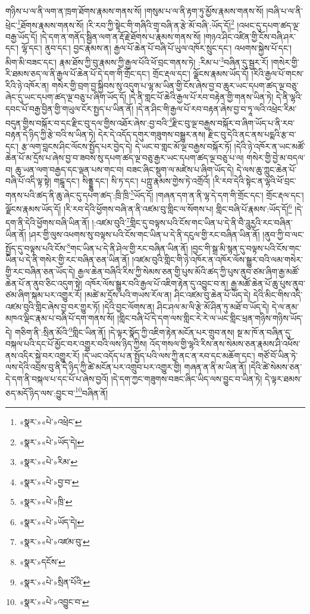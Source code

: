 གཉིས་པ་ལ་ནི་ལག་ན་ཁྲག་ཐོགས་རྣམས་གནས་སོ། །གསུམ་པ་ལ་ནི་རྟག་ཏུ་མྱོས་རྣམས་གནས་སོ། །བཞི་པ་ལ་ནི་ཕྲེང་\footnote{«སྣར་»«པེ་»འཕྲེང་}ཐོགས་རྣམས་གནས་སོ། །རི་རབ་ཀྱི་སྟེང་གི་གཞིའི་གྲྭ་བཞི་ན་རྩེ་མོ་བཞི་:ཡོད་དོ།\footnote{«སྣར་»«པེ་»ཡོད་དེ།} །འཕང་དུ་དཔག་ཚད་ལྔ་བརྒྱ་ཡོད་དོ། །དེ་དག་ན་གནོད་སྦྱིན་ལག་ན་རྡོ་རྗེ་ཐོགས་པ་རྣམས་གནས་སོ། །གཉའ་ཤིང་འཛིན་གྱི་ངོས་བཞི་ཤར་དང་། ལྷོ་དང་། ནུབ་དང་། བྱང་རྣམས་ན། རྒྱལ་པོ་ཆེན་པོ་བཞི་པོ་ཡུལ་འཁོར་སྲུང་དང་། འཕགས་སྐྱེས་པོ་དང་། མིག་མི་བཟང་དང་། རྣམ་ཐོས་ཀྱི་བུ་རྣམས་ཀྱི་རྒྱལ་པོའི་ཕོ་བྲང་གནས་ཏེ། :རིམ་པ་\footnote{«སྣར་»«པེ་»རིམ་}བཞིན་དུ་སྦྱར་རོ། །གསེར་གྱི་རི་ཐམས་ཅད་ལ་ནི་རྒྱལ་པོ་ཆེན་པོ་དེ་དག་གི་གྲོང་དང་། གྲོང་རྡལ་དང་། ལྗོངས་རྣམས་ཡོད་དོ། །རིའི་རྒྱལ་པོ་གངས་རིའི་ཉེ་འཁོར་ན། གསེར་གྱི་བྲག་བྱ་སྐྱིབས་སུ་འདུག་པ་ལྷ་མ་ཡིན་གྱི་ངོས་ཞེས་བྱ་བ་ཆུར་ཡང་དཔག་ཚད་ལྔ་བཅུ་ཞེང་དུ་ཡང་དཔག་ཚད་ལྔ་བཅུ་པ་ཞིག་ཡོད་དོ། །དེ་ནི་གླང་པོ་ཆེའི་རྒྱལ་པོ་རབ་བརྟེན་གྱི་གནས་ཡིན་ཏེ། དེ་ནི་ལྷའི་དབང་པོ་བརྒྱ་བྱིན་གྱི་གཡུལ་ངོར་སྤྱད་པ་ཡིན་ནོ། །དེ་ན་ཤིང་གི་རྒྱལ་པོ་རབ་བརྟན་ཞེས་བྱ་བ་ཏཱ་ལའི་འཕྲེང་རིམ་བདུན་གྱིས་བསྐོར་བ་དང་རྫིང་བུ་དལ་གྱིས་འཐོར་ཞེས་:བྱ་བའི་\footnote{«སྣར་»«པེ་»བྱ་བ་}རྫིང་བུ་ལྔ་བརྒྱས་བསྐོར་བ་ཞིག་ཡོད་པ་ནི་རབ་བརྟན་དེ་ཉིད་ཀྱི་རྩེ་བའི་ས་ཡིན་ཏེ། དེར་དེ་འདོད་དགུར་གཟུགས་བསྒྱུར་ནས། རྫིང་བུ་དེའི་ནང་ནས་པདྨའི་རྩ་བ་དང་། རྩ་ལག་བླངས་ཤིང་ལོངས་སྤྱོད་པར་བྱེད་དེ། དེ་ཡང་བ་གླང་མོ་ལྔ་བརྒྱས་བསྐོར་ཏོ། །དེའི་ཉེ་འཁོར་ན་ཡང་མཚོ་ཆེན་པོ་མ་དྲོས་པ་ཞེས་བྱ་བ་ཟབས་སུ་དཔག་ཚད་ལྔ་བཅུ་རྒྱར་ཡང་དཔག་ཚད་ལྔ་བཅུ་པ་ལ། གསེར་གྱི་བྱེ་མ་བདལ་བ། ཆུ་ཡན་ལག་བརྒྱད་དང་ལྡན་པས་གང་བ། བཟང་ཞིང་སྡུག་ལ་མཛེས་པ་ཞིག་ཡོད་དེ། དེ་ལས་ཆུ་ཀླུང་ཆེན་པོ་བཞི་པོ་འདི་ལྟ་སྟེ། གངྒཱ་དང་། སིནྡྷུ་དང་། སི་ཏ་དང་། པཀྵུ་རྣམས་གྱེས་ཏེ་འགྲོའོ། །རི་རབ་དེའི་སྟེང་ན་ལྷའི་ཕོ་བྲང་གནས་པའི་ཚད་ནི་ཆུ་ཞེང་དུ་དཔག་ཚད་:ཁྲི་ཁྲི་\footnote{«སྣར་»«པེ་»ཁྲི་}ཡོད་དོ། །གཞན་དག་ན་ནི་ལྷ་དེ་དག་གི་གྲོང་དང་། གྲོང་རྡལ་དང་། ལྗོངས་རྣམས་ཡོད་དོ། །རི་རབ་དེའི་ཕྱོགས་བཞི་ན་ནི་འཛམ་བུ་གླིང་ལ་སོགས་པ། གླིང་བཞི་པོ་རྣམས་:ཡོད་དོ།\footnote{«སྣར་»«པེ་»ཡོད་དེ།} །དེ་དག་ནི་དེའི་ཕྱོགས་བཞི་ཡིན་ནོ། །:འཛམ་བུའི་\footnote{«སྣར་»«པེ་»འཛམ་བུ་}གླིང་དུ་བལྟས་པའི་ངོས་གང་ཡིན་པ་དེ་ནི་བཻ་ཌཱུརྱའི་རང་བཞིན་ཡིན་ནོ། །ཤར་གྱི་ལུས་འཕགས་སུ་བལྟས་པའི་ངོས་གང་ཡིན་པ་དེ་ནི་དངུལ་གྱི་རང་བཞིན་ཡིན་ནོ། །ནུབ་ཀྱི་བ་ལང་སྤྱོད་དུ་བལྟས་པའི་ངོས་\footnote{«སྣར་»དངོས་}གང་ཡིན་པ་དེ་ནི་ཤེལ་གྱི་རང་བཞིན་ཡིན་ནོ། །བྱང་གི་སྒྲ་མི་སྙན་དུ་བལྟས་པའི་ངོས་གང་ཡིན་པ་དེ་ནི་གསེར་གྱི་རང་བཞིན་ཅན་ཡིན་ནོ། །འཛམ་བུའི་གླིང་གི་ཉེ་འཁོར་ན་འཁོར་ལོས་སྒྱུར་བའི་ལམ་གསེར་གྱི་རང་བཞིན་ཅན་ཡོད་དེ། རྒྱལ་ཆེན་བཞིའི་རིས་ཀྱི་སེམས་ཅན་གྱི་པུས་མོའི་ཚད་ཀྱི་པུས་ནུབ་ཙམ་ཞིག་རྒྱ་མཚོ་ཆེན་པོ་ན་ནུབ་ཅིང་འདུག་སྟེ། འཁོར་ལོས་སྒྱུར་བའི་རྒྱལ་པོ་འཇིག་རྟེན་དུ་འབྱུང་བ་ན། རྒྱ་མཚོ་ཆེན་པོ་ཆུ་པུས་ནུབ་ཙམ་ཞིག་སྐམ་པར་འགྱུར་རོ། །མཚེ་མ་དྲོས་པའི་གཡས་རོལ་ན། ཤིང་འཛམ་བུ་ཆེན་པོ་ཡོད་དེ། དེའི་མིང་གིས་འདི་འཛམ་བུའི་གླིང་ཞེས་བྱ་བར་གྱུར་ཏོ། །དེའི་བྱང་ལོགས་ན། ཤིང་ཤལ་མ་ལི་རྩེ་མོ་ཤིན་ཏུ་མཐོ་བ་ཡོད་དེ། དེ་ལ་ནམ་མཁའ་ལྡིང་རྣམ་པ་བཞི་པོ་དག་གནས་སོ། །གླིང་བཞི་པོ་དེ་དག་ལས་གླིང་རེ་རེ་ལ་ཡང་གླིང་ཕྲན་གཉིས་གཉིས་ཡོད་དེ། གཅིག་ནི་:སྲིན་མོའི་\footnote{«སྣར་»«པེ་»སྲིན་པོའི་}གླིང་ཡིན་ནོ། །དེ་ལྟར་སྣོད་ཀྱི་འཇིག་རྟེན་མངོན་པར་གྲུབ་ནས། སྔ་མ་ཁོ་ན་བཞིན་དུ་བསྐལ་པའི་དང་པོ་མྱོང་བར་འགྱུར་བའི་ལས་ཉིད་ཀྱིས། འོད་གསལ་གྱི་ལྷའི་རིས་ནས་སེམས་ཅན་རྣམས་ཤི་འཕོས་ནས་འདིར་སྐྱེ་བར་འགྱུར་རོ། །དེ་ཡང་འདོད་པ་ན་སྤྱོད་པའི་ལས་ཀྱི་ནང་ན་རབ་དང་མཆོག་དང་། གཙོ་བོ་ཡིན་ཏེ་ལས་དེའི་འབྲས་བུ་ནི་དེ་ཉིད་ཀྱི་ཚེ་མངོན་པར་འགྲུབ་པར་འགྱུར་གྱི། གཞན་ན་ནི་མ་ཡིན་ནོ། །དེའི་ཚེ་སེམས་ཅན་དེ་དག་ནི་བསྐལ་པ་དང་པོ་པ་ཞེས་བྱའོ། །དེ་དག་ཀྱང་གཟུགས་བཟང་ཞིང་ཡིད་ལས་བྱུང་བ་ཡིན་ཏེ། དེ་ལྟར་ཐམས་ཅད་མདོ་ཉིད་ལས་:བྱུང་བ་\footnote{«སྣར་»«པེ་»འབྱུང་བ་}བཞིན་ནོ། 